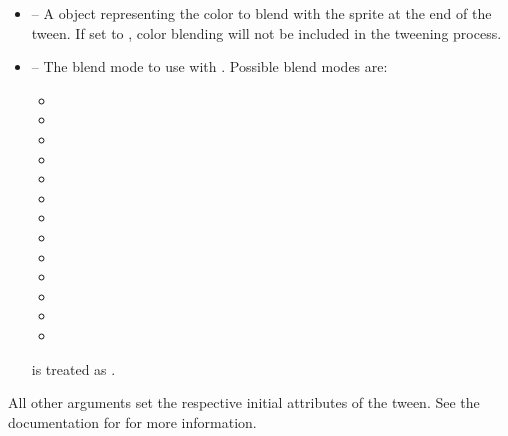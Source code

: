 \documentclass[letterpaper,10pt,english]{sphinxmanual}
\begin{document}
\begin{fulllineitems}
\begin{itemize}
\item {} 
 -- A {\hyperref[gfx:sge.gfx.Color]{\emph{}}} object representing the
color to blend with the sprite at the end of the tween.  If
set to , color blending will not be included in
the tweening process.

\item {} 
 -- The blend mode to use with .
Possible blend modes are:
\begin{itemize}
\item {} 

\item {} 

\item {} 

\item {} 

\item {} 

\item {} 

\item {} 

\item {} 

\item {} 

\item {} 

\item {} 

\item {} 

\item {} 

\end{itemize}

 is treated as .

\end{itemize}

All other arguments set the respective initial attributes of the
tween.  See the documentation for {\hyperref[gfx:sge.gfx.Sprite]{\emph{}}} for
more information.

\end{fulllineitems}
\end{document}
